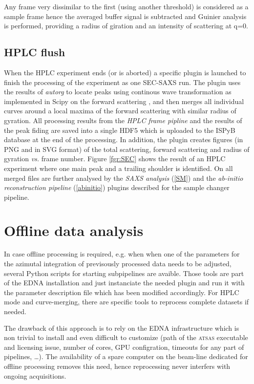 \documentclass[preprint,pdf]{iucr}              %
\begin{document}
Any frame very dissimilar to the first (using another threshold) is considered
as a sample frame hence the averaged buffer signal is subtracted and Guinier
analysis is performed, providing a radius of giration and an intensity of
scattering at q=0. 

\subsection{HPLC flush}
When the HPLC experiment ends (or is aborted) a specific plugin is launched to
finish the processing of the experiment as one SEC-SAXS run. 
The plugin uses the results of \textit{autorg} to locate peaks using continous
wave transformation as implemented in Scipy on the forward scattering
\cite{cwt, scipy}, and then merges all individual curves around a local maxima
of the forward scattering with similar radius of gyration. 
All processing results from the \textit{HPLC frame pipline} and the results of 
the peak fiding are saved into a single HDF5 which is uploaded to the ISPyB
database at the end of the processing. 
In addition, the plugin creates figures (in PNG and in SVG format) of the
total scattering, forward scattering and radius of gyration \textit{vs.} frame
number. 
Figure \ref{fgr:SEC} shows the result of an HPLC 
experiment where one main peak and a trailing shoulder is identified.
On all merged files are further analysed by the \textit{SAXS analysis}
(\ref{SM}) and the \textit{ab-initio reconstruction pipeline}
(\ref{abinitio}) plugins described for the sample changer pipeline.

\section{Offline data analysis}
In case offline processing is required, e.g. when when one of the parameters for
the azimutal integration of previsously processed data needs to be adjusted, 
several Python scripts for starting subpipelines are avaible. 
Those tools are part of the EDNA installation and just instanciate the needed
plugin and run it with the parameter description file which has been modified
accordingly. 
For HPLC mode and curve-merging, there are specific tools to reprocess complete
datasets if needed.

The drawback of this approach is to rely on the EDNA infrastructure which is
non trivial to install and even difficult to customize (path of the
\textsc{atsas} executable and licensing issue, number of cores, GPU
configration, timeouts for any part of pipelines, \ldots). 
The availability of a spare computer on the beam-line dedicated for offline
processing removes this need, hence reprocessing never interfers with ongoing
acquisitions.
\end{document}
